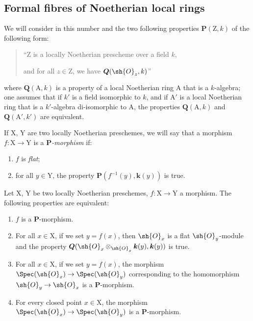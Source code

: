 \subsection{Formal fibres of Noetherian local rings}
\label{subsection:IV.7.3}

\begin{env}[7.3.1]
\label{IV.7.3.1}
We will consider in this number and the two following properties $\boldsymbol{P}(\mathrm{Z},k)$ of the following form:
\begin{quote}
``$\mathrm{Z}$ is a locally Noetherian prescheme over a field $k$,

and for all $z\in\mathrm{Z}$, we have $\boldsymbol{Q}(\sh{O}_z,k)$''
\end{quote}
where $\boldsymbol{Q}(\mathrm{A},k)$ is a property of a local Noetherian ring $\mathrm{A}$ that is a $k$-algebra; one assumes that if $k'$ is a field isomorphic to $k$, and if $\mathrm{A}'$ is a local Noetherian ring that is a $k'$-algebra di-isomorphic to $\mathrm{A}$, the properties $\boldsymbol{Q}(\mathrm{A},k)$ and $\boldsymbol{Q}(\mathrm{A}',k')$ are equivalent.
\end{env}

If $\mathrm{X}$, $\mathrm{Y}$ are two locally Noetherian preschemes, we will say that a morphism $f:\mathrm{X}\to\mathrm{Y}$ is a \emph{$\boldsymbol{P}$-morphism} if:
\begin{enumerate}[label=\arabic{enumi}\textsuperscript{o}]
  \item $f$ is \emph{flat};
  \item for all $y\in\mathrm{Y}$, the property $\boldsymbol{P}(f^{-1}(y),\boldsymbol{k}(y))$ is true.
\end{enumerate}


\begin{lemma}[7.3.2]
\label{IV.7.3.2}
Let $\mathrm{X}$, $\mathrm{Y}$ be two locally Noetherian preschemes, $f:\mathrm{X}\to\mathrm{Y}$ a morphism.
The following properties are equivalent:
\begin{enumerate}[label=\emph{\alph*)}]
  \item $f$ is a $\boldsymbol{P}$-morphism.
  \item For all $x\in\mathrm{X}$, if we set $y=f(x)$, then $\sh{O}_x$ is a flat $\sh{O}_y$-module and the property $\boldsymbol{Q}(\sh{O}_x\otimes_{\sh{O}_y}\boldsymbol{k}(y),\boldsymbol{k}(y))$ is true.
  \item For all $x\in\mathrm{X}$, if we set $y=f(x)$, the morphism $\Spec(\sh{O}_x)\to\Spec(\sh{O}_y)$ corresponding to the homomorphism $\sh{O}_y\to\sh{O}_x$ is a $\boldsymbol{P}$-morphism.
  \item[\emph{c$'$)}] For every closed point $x\in\mathrm{X}$, the morphism $\Spec(\sh{O}_x)\to\Spec(\sh{O}_y)$ is a $\boldsymbol{P}$-morphism.
\end{enumerate}
\end{lemma}

